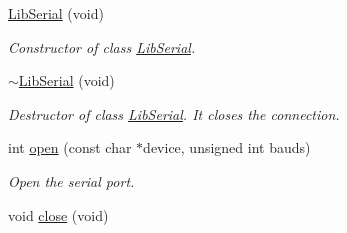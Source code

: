 \begin{DoxyCompactItemize}
\item 
\hyperlink{class_lib_serial_a06bf0b9fdef8eb5390bc4f0ec187bd5a}{Lib\+Serial} (void)\hypertarget{class_lib_serial_a06bf0b9fdef8eb5390bc4f0ec187bd5a}{}\label{class_lib_serial_a06bf0b9fdef8eb5390bc4f0ec187bd5a}

\begin{DoxyCompactList}\small\item\em Constructor of class \hyperlink{class_lib_serial}{Lib\+Serial}. \end{DoxyCompactList}\item 
\hyperlink{class_lib_serial_aaf59ab1dc978f562c6b85432a6274a0d}{$\sim$\+Lib\+Serial} (void)\hypertarget{class_lib_serial_aaf59ab1dc978f562c6b85432a6274a0d}{}\label{class_lib_serial_aaf59ab1dc978f562c6b85432a6274a0d}

\begin{DoxyCompactList}\small\item\em Destructor of class \hyperlink{class_lib_serial}{Lib\+Serial}. It closes the connection. \end{DoxyCompactList}\item 
int \hyperlink{class_lib_serial_adbcac5969ef17791e9115f090cf158ce}{open} (const char $\ast$device, unsigned int bauds)
\begin{DoxyCompactList}\small\item\em Open the serial port. \end{DoxyCompactList}\item 
void \hyperlink{class_lib_serial_a7edc8286ab0e3e200a4ba35a9d503bec}{close} (void)\hypertarget{class_lib_serial_a7edc8286ab0e3e200a4ba35a9d503bec}{}\label{class_lib_serial_a7edc8286ab0e3e200a4ba35a9d503bec}


\end{DoxyCompactItemize}
